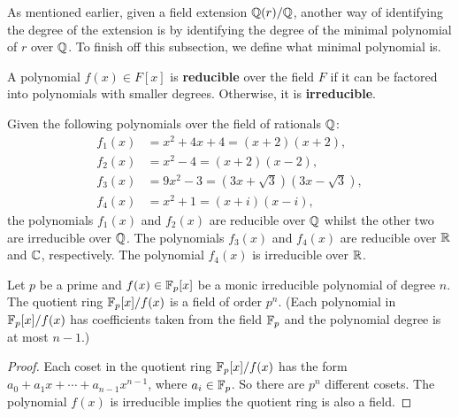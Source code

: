 \documentclass[../main.tex]{subfiles}
\begin{document}
As mentioned earlier, given a field extension $\mathbb{Q}(r)/\mathbb{Q}$, another way of identifying the degree of the extension is by identifying the degree of the minimal polynomial of $r$ over $\mathbb{Q}$. To finish off this subsection, we define what minimal polynomial is.

\begin{definition}
A polynomial $f(x) \in F[x]$ is \textbf{reducible} over the field $F$ if it can be factored into polynomials with smaller degrees. Otherwise, it is \textbf{irreducible}.\reversemarginpar
{}
\end{definition}

\begin{example}
Given the following polynomials over the field of rationals $\mathbb{Q}$: 
\begin{align*}
    f_1(x)&=x^2+4x+4=(x+2)(x+2),\\
    f_2(x)&=x^2-4=(x+2)(x-2),\\
    f_3(x)&=9x^2-3=(3x+\sqrt{3})(3x-\sqrt{3}),\\
    f_4(x)&=x^2+1=(x+i)(x-i),
\end{align*}
the polynomials $f_1(x)$ and $f_2(x)$ are reducible over $\mathbb{Q}$ whilst the other two are irreducible over $\mathbb{Q}$. The polynomials $f_3(x)$ and $f_4(x)$ are reducible over $\mathbb{R}$ and $\mathbb{C}$, respectively. The polynomial $f_4(x)$ is irreducible over $\mathbb{R}$.

\end{example}

\begin{theorem}
\label{thm:quoRngIsField}
Let $p$ be a prime and $f(x) \in \mathbb{F}_p[x]$ be a monic irreducible polynomial of degree $n$. The quotient ring $\mathbb{F}_p[x]/f(x)$ is a field of order $p^n$. (Each polynomial in $\mathbb{F}_p[x]/f(x)$ has coefficients taken from the field $\mathbb{F}_p$ and the polynomial degree is at most $n-1$.)
\end{theorem}
\begin{proof}
Each coset in the quotient ring $\mathbb{F}_p[x]/f(x)$ has the form $a_0 + a_1 x + \cdots + a_{n-1} x^{n-1}$, where $a_i \in \mathbb{F}_p$. So there are $p^n$ different cosets. The polynomial $f(x)$ is irreducible implies the quotient ring is also a field. 
\end{proof}
\end{document}
